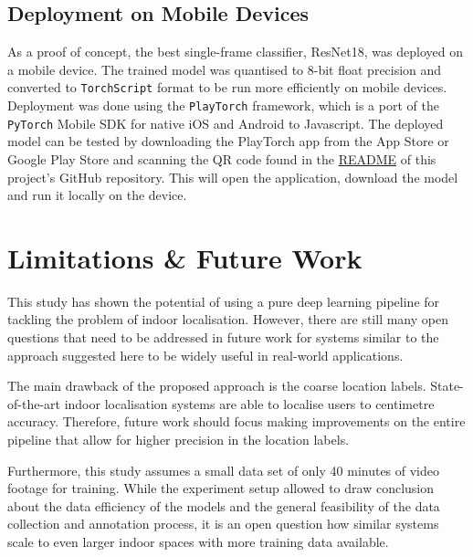 \documentclass[a4paper]{article}
\begin{document}

\subsection{Deployment on Mobile Devices}
\label{sub:deploment}

As a proof of concept, the best single-frame classifier, ResNet18, was deployed
on a mobile device. The trained model was quantised to 8-bit float precision and
converted to \texttt{TorchScript} format to be run more efficiently on mobile
devices. Deployment was done using the \texttt{PlayTorch}
framework, which is a port of the \texttt{PyTorch} Mobile SDK
for native iOS and Android to Javascript. The deployed model can be tested by
downloading the PlayTorch app from the App Store or Google Play Store and
scanning the QR code found in the \href{https://github.com/mikasenghaas}{README}
of this project's GitHub repository. This will open the application, download
the model and run it locally on the device.



\section{Limitations \& Future Work} %
\label{sec:discussion}

This study has shown the potential of using a pure deep learning pipeline for
tackling the problem of indoor localisation. However, there are still many
open questions that need to be addressed in future work for systems similar to
the approach suggested here to be widely useful in real-world applications.

The main drawback of the proposed approach is the coarse location labels.
State-of-the-art indoor localisation systems are able to localise users to
centimetre accuracy. Therefore, future work should focus making improvements
on the entire pipeline that allow for higher precision in the location labels.

Furthermore, this study assumes a small data set of only 40 minutes of video
footage for training. While the experiment setup allowed to draw conclusion
about the data efficiency of the models and the general feasibility of the
data collection and annotation process, it is an open question how similar
systems scale to even larger indoor spaces with more training data available.
\end{document}
